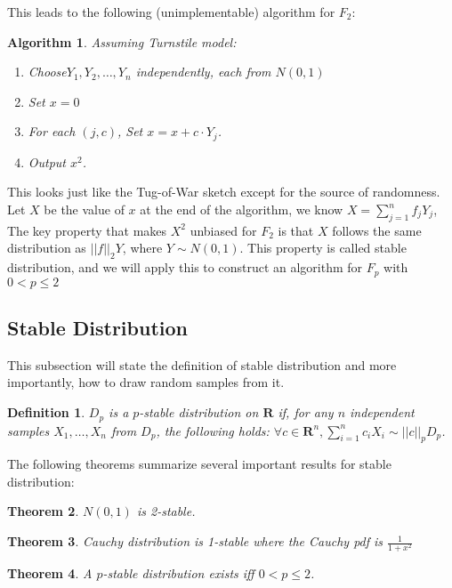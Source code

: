 \documentclass[11pt]{article}
\theoremstyle{plain}
\newtheorem{theorem}{Theorem}[section]
\newtheorem{algorithm}{Algorithm}[section]
\newtheorem{definition}[theorem]{Definition}
\begin{document}
This leads to the following (unimplementable) algorithm for $F_2$:

\begin{algorithm}
\label{al:JL}
Assuming Turnstile model:
\begin{enumerate}
	\item Choose$Y_1, Y_2, \dots, Y_n$ independently, each from $N(0,1)$
	\item Set $x=0$
	\item For each $(j,c)$, Set $x=x+c\cdot Y_j$.
	\item Output $x^2$.
\end{enumerate}
\end{algorithm}

This looks just like the Tug-of-War sketch except for the source of 
randomness. Let $X$ be the value of $x$ at the end of the algorithm, we 
know $X=\sum_{j=1}^n f_jY_j$, The key property that makes $X^2$ unbiased 
for $F_2$ is that $X$ follows the same distribution as $||f||_2Y$, where 
$Y\sim N(0,1)$. This property is called stable distribution, and we will apply 
this to construct an algorithm for $F_p$ with $0<p\leq2$

\subsection{Stable Distribution}
This subsection will state the definition of stable distribution and more 
importantly, how to draw random samples from it. 

\begin{definition}
	$D_{p}$ is a $p$-stable distribution on $\mathbf{R}$ if, for any $n$ 
	independent samples $X_1,\dots,X_n$ from $D_p$, the following holds: 
	$\forall c\in \mathbf{R}^n,  \sum_{i=1}^n c_iX_i \sim ||c||_p D_p$.
\end{definition}
The following theorems summarize several important results for stable 
distribution:

\begin{theorem}
$N(0, 1)$ is 2-stable.
\end{theorem}

\begin{theorem}
Cauchy distribution is 1-stable where the Cauchy pdf is $\frac{1}{1+x^2}$
\end{theorem}

\begin{theorem}
	\label{th:pstable}
A $p$-stable distribution exists iff $0<p\le 2$.
\end{theorem}
\end{document}
